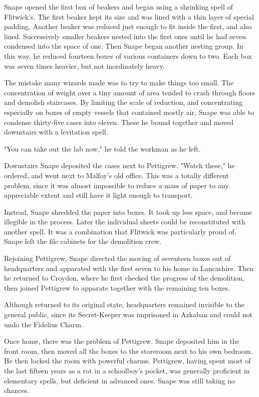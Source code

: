 Snape opened the first box of beakers and began using a shrinking spell of Flitwick's. The first beaker kept its size and was lined with a thin layer of special padding. Another beaker was reduced just enough to fit inside the first, and also lined. Successively smaller beakers nested into the first ones until he had seven condensed into the space of one. Then Snape began another nesting group. In this way, he reduced fourteen boxes of various containers down to two. Each box was seven times heavier, but not inordinately heavy.

The mistake many wizards made was to try to make things too small. The concentration of weight over a tiny amount of area tended to crash through floors and demolish staircases. By limiting the scale of reduction, and concentrating especially on boxes of empty vessels that contained mostly air, Snape was able to condense thirty-five cases into eleven. These he bound together and moved downstairs with a levitation spell.

"You can take out the lab now," he told the workman as he left.

Downstairs Snape deposited the cases next to Pettigrew. "Watch these," he ordered, and went next to Malfoy's old office. This was a totally different problem, since it was almost impossible to reduce a mass of paper to any appreciable extent and still have it light enough to transport.

Instead, Snape shredded the paper into boxes. It took up less space, and became illegible in the process. Later the individual sheets could be reconstituted with another spell. It was a combination that Flitwick was particularly proud of. Snape left the file cabinets for the demolition crew.

Rejoining Pettigrew, Snape directed the moving of seventeen boxes out of headquarters and apparated with the first seven to his home in Lancashire. Then he returned to Croydon, where he first checked the progress of the demolition, then joined Pettigrew to apparate together with the remaining ten boxes.

Although returned to its original state, headquarters remained invisible to the general public, since its Secret-Keeper was imprisoned in Azkaban and could not undo the Fidelius Charm.

Once home, there was the problem of Pettigrew. Snape deposited him in the front room, then moved all the boxes to the storeroom next to his own bedroom. He then locked the room with powerful charms. Pettigrew, having spent most of the last fifteen years as a rat in a schoolboy's pocket, was generally proficient in elementary spells, but deficient in advanced ones. Snape was still taking no chances.

